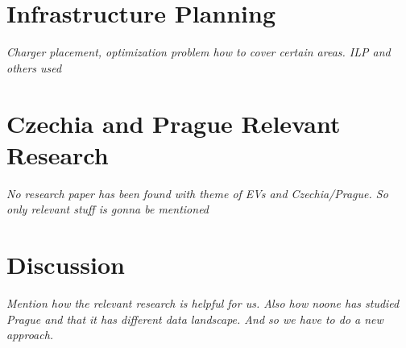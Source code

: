 \section{Infrastructure Planning}

\textit{Charger placement, optimization problem how to cover certain areas. ILP and others used}


\section{Czechia and Prague Relevant Research}

\textit{No research paper has been found with theme of EVs and Czechia/Prague. So only relevant stuff is gonna be mentioned}





\section{Discussion}

\textit{Mention how the relevant research is helpful for us. Also how noone has studied Prague and that it has different data landscape. And so we have to do a new approach.}


